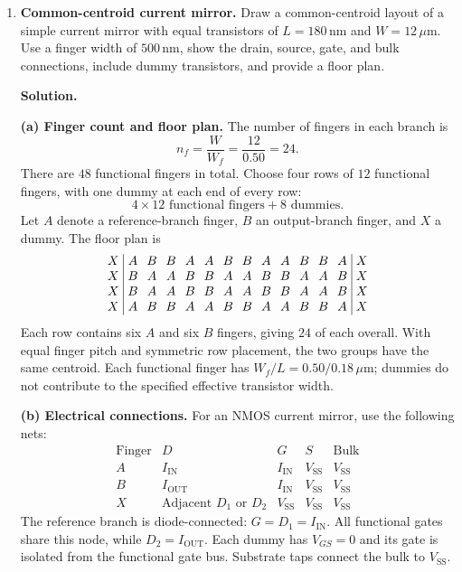 \documentclass[12pt,letterpaper]{article}
\begin{document}
\begin{enumerate}
{\small\textit{Rule references:} CMHV7SF Design Manual, applicable to
V1.3.1.0, Table 24, p.~67, Rules 1--2 and 10--11; Table 26, p.~77,
Rules 200 and 204. The dogbone transition is also subject to Rule 114
on p.~69.}

\newpage

\item \textbf{Common-centroid current mirror.}
Draw a common-centroid layout of a simple current mirror with equal
transistors of $L=180\,\mathrm{nm}$ and $W=12\,\mu\mathrm{m}$.
Use a finger width of $500\,\mathrm{nm}$, show the drain, source,
gate, and bulk connections, include dummy transistors, and provide
a floor plan.

\textbf{Solution.}

\textbf{(a) Finger count and floor plan.}
The number of fingers in each branch is
\[
n_f=\frac{W}{W_f}=\frac{12}{0.50}=24.
\]
There are $48$ functional fingers in total. Choose four rows of
$12$ functional fingers, with one dummy at each end of every row:
\[
\boxed{4\times12\text{ functional fingers}+8\text{ dummies}.}
\]
Let $A$ denote a reference-branch finger, $B$ an output-branch finger,
and $X$ a dummy. The floor plan is
\[
\begingroup
\setlength{\arraycolsep}{3.5pt}
\begin{array}{c|*{12}{c}|c}
X&A&B&B&A&A&B&B&A&A&B&B&A&X\\
X&B&A&A&B&B&A&A&B&B&A&A&B&X\\
X&B&A&A&B&B&A&A&B&B&A&A&B&X\\
X&A&B&B&A&A&B&B&A&A&B&B&A&X
\end{array}
\endgroup
\]
Each row contains six $A$ and six $B$ fingers, giving $24$ of each
overall. With equal finger pitch and symmetric row placement, the
two groups have the same centroid. Each functional finger has
$W_f/L=0.50/0.18\,\mu\mathrm{m}$; dummies do not contribute to the
specified effective transistor width.

\textbf{(b) Electrical connections.}
For an NMOS current mirror, use the following nets:
\[
\begin{array}{c|c|c|c|c}
\text{Finger}&D&G&S&\text{Bulk}\\ \hline
A&I_{\mathrm{IN}}&I_{\mathrm{IN}}&V_{\mathrm{SS}}&V_{\mathrm{SS}}\\
B&I_{\mathrm{OUT}}&I_{\mathrm{IN}}&V_{\mathrm{SS}}&V_{\mathrm{SS}}\\
X&\text{Adjacent }D_1\text{ or }D_2&V_{\mathrm{SS}}&V_{\mathrm{SS}}&V_{\mathrm{SS}}
\end{array}
\]
The reference branch is diode-connected:
$G=D_1=I_{\mathrm{IN}}$. All functional gates share this node, while
$D_2=I_{\mathrm{OUT}}$. Each dummy has $V_{GS}=0$ and its gate is
isolated from the functional gate bus. Substrate taps connect the
bulk to $V_{\mathrm{SS}}$.


\end{enumerate}
\end{document}
